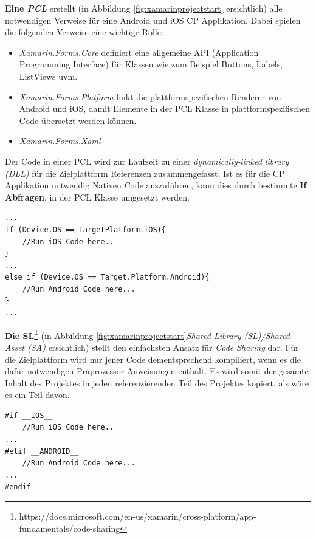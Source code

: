 	\textbf{Eine \textit{PCL}} erstellt (in Abbildung \ref{fig:xamarinprojectstart} ersichtlich) alle notwendigen Verweise für eine Android und iOS CP Applikation. Dabei spielen die folgenden Verweise eine wichtige Rolle:
	\begin{itemize}
		\setlength\itemsep{0em}
		\item \textit{Xamarin.Forms.Core} definiert eine allgemeine API (Application Programming Interface) für Klassen wie zum Beispiel Buttons, Labels, ListViews uvm.
		\item \textit{Xamarin.Forms.Platform} linkt die plattformspezifischen Renderer von Android und iOS, damit Elemente in der PCL Klasse in plattformspezifischen Code übersetzt werden können.
		\item \textit{Xamarin.Forms.Xaml} 
	\end{itemize}
	\newpage
	Der Code in einer PCL wird zur Laufzeit zu einer \textit{dynamically-linked library (DLL)} für die Zielplattform Referenzen zusammengefasst. Ist es für die CP Applikation notwendig Nativen Code auszuführen, kann dies durch bestimmte \textbf{If Abfragen}, in der PCL Klasse umgesetzt werden.\\

	\begin{lstlisting}[caption={Ausführung von plattformspezifischen Code in PCL},label={lst:xamarinpcl},captionpos=b,style=csharp]
...
if (Device.OS == TargetPlatform.iOS){
	//Run iOS Code here..
}
...
else if (Device.OS == Target.Platform.Android){
	//Run Android Code here...
}
...
	\end{lstlisting}

	\textbf{Die SL\footnote{https://docs.microsoft.com/en-us/xamarin/cross-platform/app-fundamentals/code-sharing}} (in Abbildung \ref{fig:xamarinprojectstart}\textit{Shared Library (SL)/Shared Asset (SA)} ersichtlich) stellt den einfachsten Ansatz für \textit{Code Sharing} dar. Für die Zielplattform wird nur jener Code dementsprechend kompiliert, wenn es die dafür notwendigen Präprozessor Anweisungen enthält. Es wird somit der gesamte Inhalt des Projektes in jeden referenzierenden Teil des Projektes kopiert, als wäre es ein Teil davon.\\

	\begin{lstlisting}[caption={Ausführung von plattformspezifischen Code in SA/SL},label={lst:xamarinslsa},captionpos=b,style=csharp]
#if __iOS__
	//Run iOS Code here..
...
#elif __ANDROID__
	//Run Android Code here...
...
#endif
	\end{lstlisting}

